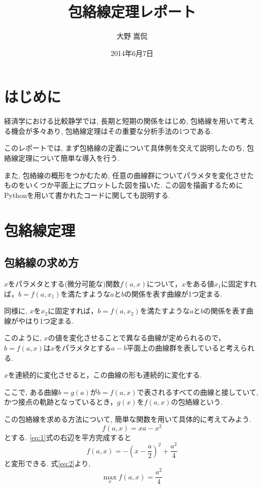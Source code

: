 \documentclass[11pt,a4j,fleqn]{jarticle}
\title{包絡線定理レポート}
\author{大野 嵩侃}
\date{2014年6月7日}
\begin{document}
\maketitle

\section{はじめに}
経済学における比較静学では, 長期と短期の関係をはじめ, 包絡線を用いて考える機会が多々あり, 包絡線定理はその重要な分析手法の1つである.

このレポートでは, まず包絡線の定義について具体例を交えて説明したのち, 包絡線定理について簡単な導入を行う.

また, 包絡線の概形をつかむため, 任意の曲線群についてパラメタを変化させたものをいくつか平面上にプロットした図を描いた. この図を描画するためにPythonを用いて書かれたコードに関しても説明する.

\section{包絡線定理}

\subsection{包絡線の求め方}
$x$をパラメタとする(微分可能な)関数$f(a,x)$について，$x$をある値$x_1$に固定すれば，$b=f(a,x_1)$を満たすような$a$と$b$の関係を表す曲線が1つ定まる.

同様に, $x$を$x_2$に固定すれば，$b=f(a,x_2)$を満たすような$a$と$b$の関係を表す曲線がやはり1つ定まる.

このように, $x$の値を変化させることで異なる曲線が定められるので，$b=f(a,x)$は$x$をパラメタとする$a-b$平面上の曲線群を表していると考えられる.

$x$を連続的に変化させると，この曲線の形も連続的に変化する.

ここで, ある曲線$b=g(a)$が$b=f(a,x)$で表されるすべての曲線と接していて, かつ接点の軌跡となっているとき，$g(x)$を$f(a,x)$の包絡線という.


この包絡線を求める方法について, 簡単な関数を用いて具体的に考えてみよう.
\begin{equation}
f(a, x) = x a - x^2\label{eq:1}
\end{equation}
とする. \eqref{eq:1}式の右辺を平方完成すると
\begin{equation}
f(a,  x) = -\left(x - \frac{a}{2}\right)^2 + \frac{a^2}{4} \label{eq:2}
\end{equation}
と変形できる. 式\eqref{eq:2}より, 
\begin{equation} 
\max_{x}f(a, x) = \frac{a^2}{4} \label{eq:3}
\end{equation}
\end{document}
